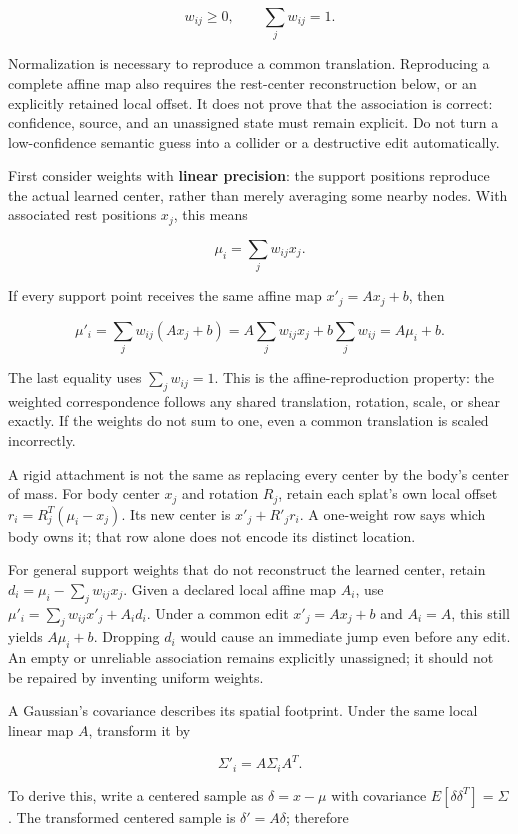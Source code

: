 \[
w_{ij}\ge 0,\qquad \sum_j w_{ij}=1.
\]

Normalization is necessary to reproduce a common translation. Reproducing a complete affine map also requires the rest-center reconstruction below, or an explicitly retained local offset. It does not prove that the association is correct: confidence, source, and an unassigned state must remain explicit. Do not turn a low-confidence semantic guess into a collider or a destructive edit automatically.

First consider weights with \textbf{linear precision}: the support positions reproduce the actual learned center, rather than merely averaging some nearby nodes. With associated rest positions \(x_j\), this means

\[
\mu_i=\sum_jw_{ij}x_j.
\]

If every support point receives the same affine map \(x'_j=Ax_j+b\), then

\[
\mu'_i=\sum_jw_{ij}(Ax_j+b)
=A\sum_jw_{ij}x_j+b\sum_jw_{ij}
=A\mu_i+b.
\]

The last equality uses \(\sum_jw_{ij}=1\). This is the affine-reproduction property: the weighted correspondence follows any shared translation, rotation, scale, or shear exactly. If the weights do not sum to one, even a common translation is scaled incorrectly.

A rigid attachment is not the same as replacing every center by the body's center of mass. For body center \(x_j\) and rotation \(R_j\), retain each splat's own local offset \(r_i=R_j^T(\mu_i-x_j)\). Its new center is \(x'_j+R'_jr_i\). A one-weight row says which body owns it; that row alone does not encode its distinct location.

For general support weights that do not reconstruct the learned center, retain \(d_i=\mu_i-\sum_jw_{ij}x_j\). Given a declared local affine map \(A_i\), use \(\mu'_i=\sum_jw_{ij}x'_j+A_id_i\). Under a common edit \(x'_j=Ax_j+b\) and \(A_i=A\), this still yields \(A\mu_i+b\). Dropping \(d_i\) would cause an immediate jump even before any edit. An empty or unreliable association remains explicitly unassigned; it should not be repaired by inventing uniform weights.

A Gaussian's covariance describes its spatial footprint. Under the same local linear map \(A\), transform it by

\[
\Sigma'_i=A\Sigma_iA^T.
\]

To derive this, write a centered sample as \(\delta=x-\mu\) with covariance \(E[\delta\delta^T]=\Sigma\). The transformed centered sample is \(\delta'=A\delta\); therefore

